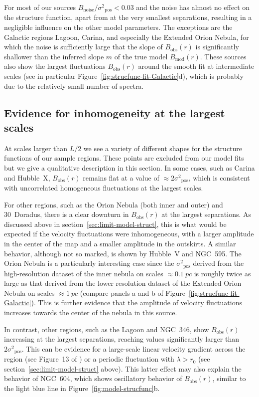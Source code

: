 \documentclass[fleqn,usenatbib, useAMS, a4paper]{mnras}
\newcommand\pos{\ensuremath{_{\mathrm{pos}}}}
\newcommand\noise{\ensuremath{_{\text{noise}}}}
\newcommand\obs{\ensuremath{_{\mathrm{obs}}}}
\newcommand\model{\ensuremath{_{\mathrm{mod}}}}
\begin{document}
For most of our sources \(B\noise / \sigma^2\pos < 0.03 \) and the noise
has almost no effect on the structure function,
apart from at the very smallest separations,
resulting in a negligible influence on the other model parameters.
The exceptions are the Galactic regions Lagoon, Carina,
and especially the Extended Orion Nebula,
for which the noise is sufficiently large that the slope
of \(B\obs(r)\) is significantly shallower than
the inferred slope \(m\) of the true model \(B\model(r)\).
These sources also show the largest fluctuations
\(B\obs(r)\) around the smooth fit
at intermediate scales
(see in particular Figure~\ref{fig:strucfunc-fit-Galactic}d),
which is probably due to the relatively small number of spectra.


\subsection{Evidence for inhomogeneity at the largest scales}
\label{sec:evid-inhom-at}

At scales larger than \(L/2\)
we see a variety of different shapes for the structure functions
of our sample regions.
These points are excluded from our model fits but we give
a qualitative description in this section.
In some cases,
such as Carina and Hubble~X,
\(B\obs(r)\) remains flat at a value of \(\approx 2\sigma^2\pos\),
which is consistent with uncorrelated homogeneous fluctuations
at the largest scales.

For other regions,
such as the Orion Nebula (both inner and outer) and 30~Doradus,
there is a clear downturn in \(B\obs(r)\) at the largest separations.
As discussed above in section~\ref{sec:limit-model-struct},
this is what would be expected if the velocity fluctuations
were inhomogeneous, with a larger amplitude in the center of the map
and a smaller amplitude in the outskirts.
A similar behavior, although not so marked, is shown by
Hubble~V and NGC~595.
The Orion Nebula is a particularly interesting case
since the \(\sigma^2\pos\) derived from the high-resolution dataset of the inner nebula on scales \(\approx \SI{0.1}{pc}\)
is roughly twice as large as that derived from the lower resolution
dataset of the Extended Orion Nebula on scales \(\approx \SI{1}{pc}\)
(compare panels a and b of Figure~\ref{fig:strucfunc-fit-Galactic}).
This is further evidence that the amplitude of velocity fluctuations
increases towards the center of the nebula in this source.

In contrast, other regions,
such as the Lagoon and NGC~346,
show \(B\obs(r)\) increasing at the largest separations,
reaching values significantly larger than \(2\sigma^2\pos\).
This can be evidence for a large-scale linear velocity gradient
across the region (see Figure~13 of \citealp{arthur2016turbulence})
or a periodic fluctuation with \(\lambda > r_0\)
(see section~\ref{sec:limit-model-struct} above).
This latter effect may also explain the behavior of NGC~604,
which shows oscillatory behavior of \(B\obs(r)\),
similar to the light blue line in Figure~\ref{fig:model-strucfunc}b.
\end{document}
